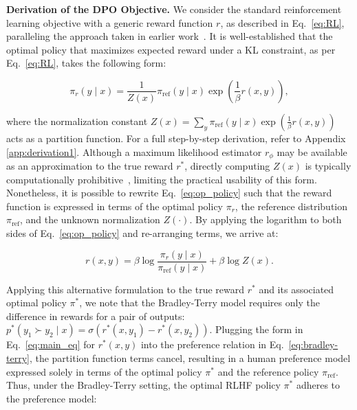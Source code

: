 \textbf{Derivation of the DPO Objective.} We consider the standard reinforcement learning objective with a generic reward function $r$, as described in Eq.~\ref{eq:RL}, paralleling the approach taken in earlier work~\citep{peters2007reinforcement, peng2019advantage, korbak2022reinforcement, go2023aligning}. It is well-established that the optimal policy that maximizes expected reward under a KL constraint, as per Eq.~\ref{eq:RL}, takes the following form:

\begin{equation}\label{eq:op_policy}
    \pi_r(y\mid x) = \frac{1}{Z(x)}\pi_\text{ref}(y\mid x)\exp\left(\frac{1}{\beta}r(x, y)\right),
\end{equation}

where the normalization constant $Z(x) =\sum_{y}\pi_\text{ref}(y\mid x)\exp\left(\frac{1}{\beta}r(x, y)\right)$ acts as a partition function. For a full step-by-step derivation, refer to Appendix \ref{app:derivation1}. Although a maximum likelihood estimator $r_\phi$ may be available as an approximation to the true reward $r^*$, directly computing $Z(x)$ is typically computationally prohibitive~\citep{korbak2022reinforcement, go2023aligning}, limiting the practical usability of this form. Nonetheless, it is possible to rewrite Eq.~\ref{eq:op_policy} such that the reward function is expressed in terms of the optimal policy $\pi_r$, the reference distribution $\pi_\text{ref}$, and the unknown normalization $Z(\cdot)$. By applying the logarithm to both sides of Eq.~\ref{eq:op_policy} and re-arranging terms, we arrive at:

\begin{equation}\label{eq:main_eq}
    r(x,y) =\beta \log \frac{\pi_r(y\mid x)}{\pi_\text{ref}(y\mid x)} + \beta \log Z(x).
\end{equation}

Applying this alternative formulation to the true reward $r^*$ and its associated optimal policy $\pi^*$, we note that the Bradley-Terry model requires only the difference in rewards for a pair of outputs: ${p^*(y_1 \succ y_2 \mid x) = \sigma(r^*(x, y_1) - r^*(x, y_2))}$. Plugging the form in Eq.~\ref{eq:main_eq} for $r^*(x,y)$ into the preference relation in Eq.~\ref{eq:bradley-terry}, the partition function terms cancel, resulting in a human preference model expressed solely in terms of the optimal policy $\pi^*$ and the reference policy $\pi_\text{ref}$. Thus, under the Bradley-Terry setting, the optimal RLHF policy $\pi^*$ adheres to the preference model:

